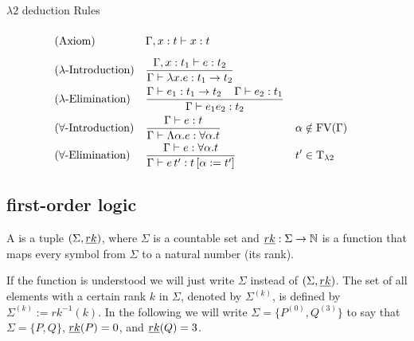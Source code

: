 $\lambda2$ deduction Rules
\begin{mdframed} 
\begingroup
\addtolength{\jot}{0.3cm}
\begin{align*}
&(\text{Axiom}) &&\Gamma,x:t\vdash x:t\vphantom{\frac{t_1}{t_1}}\\
&(\lambda\text{-Introduction}) &&\frac{\Gamma,x:t_1\vdash e:t_2}{\Gamma\vdash \lambda x.e:t_1\to t_2}\\
&(\lambda\text{-Elimination}) &&\frac{\Gamma\vdash e_1:t_1\to t_2 \hspace{0.4cm}\Gamma\vdash e_2:t_1}{\Gamma\vdash e_1e_2:t_2}\\
&(\forall\text{-Introduction}) &&\frac{\Gamma\vdash e:t}{\Gamma\vdash \Lambda\alpha.e:\forall\alpha.t} &&\alpha\notin\FV(\Gamma) \\
&(\forall\text{-Elimination}) &&\frac{\Gamma\vdash e:\forall\alpha.t }{\Gamma\vdash e\,t':t\left[ \alpha:=t'\right] } && t'\in\lambdaTypes %
\end{align*}
\endgroup
\end{mdframed}

\subsection{first-order logic}
\begin{definition}
A  is a tuple $(\Sigma,\emph{rk})$, where $\Sigma$ is a countable set and $\emph{rk}:\Sigma\to\mathbb{N}$ is a function that maps every symbol from $\Sigma$ to a natural number (its rank).
\end{definition}
If the function \rank{} is understood we will just write $\Sigma$ instead of $(\Sigma,\emph{rk})$. The set of all elements with a certain rank $k$ in $\Sigma$, denoted by $\Sigma^{(k)}$, is defined by $\Sigma^{(k)}:=rk^{-1}(k)$. In the following we will write $\Sigma=\{P^{(0)},Q^{(3)}\}$ to say that $\Sigma=\{P,Q\}$, $\emph{rk}(P)=0$, and $\emph{rk}(Q)=3$.

